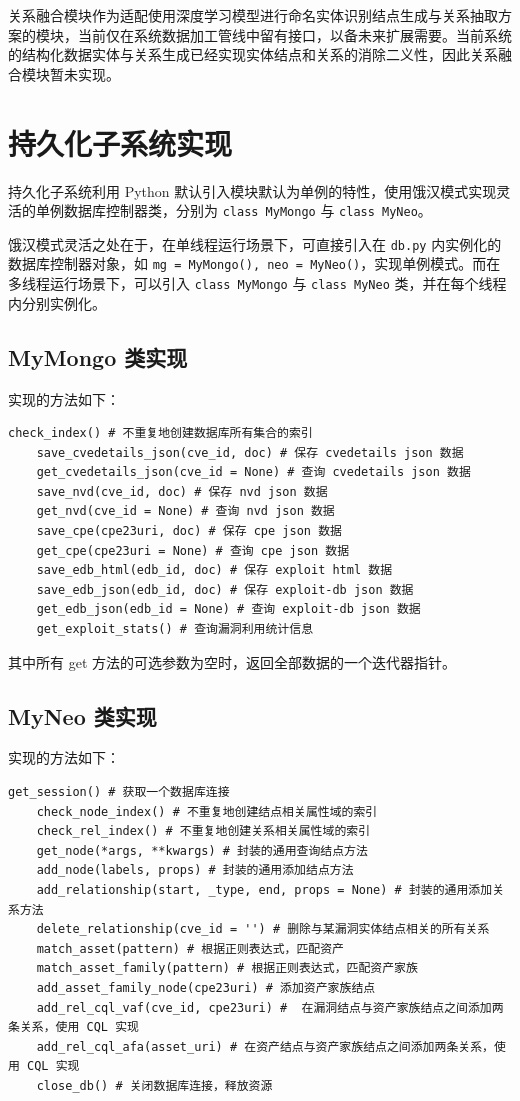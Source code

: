 \documentclass[a4paper,AutoFakeBold,oneside,12pt]{book}
\begin{document}
关系融合模块作为适配使用深度学习模型进行命名实体识别结点生成与关系抽取方案的模块，当前仅在系统数据加工管线中留有接口，以备未来扩展需要。当前系统的结构化数据实体与关系生成已经实现实体结点和关系的消除二义性，因此关系融合模块暂未实现。

\section{持久化子系统实现}

持久化子系统利用 Python 默认引入模块默认为单例的特性，使用饿汉模式\cite{}实现灵活的单例数据库控制器类，分别为 \lstinline|class MyMongo| 与 \lstinline|class MyNeo|。

饿汉模式灵活之处在于，在单线程运行场景下，可直接引入在 \lstinline|db.py| 内实例化的数据库控制器对象，如 \lstinline|mg = MyMongo(), neo = MyNeo()|，实现单例模式。而在多线程运行场景下，可以引入 \lstinline|class MyMongo| 与 \lstinline|class MyNeo| 类，并在每个线程内分别实例化。

\subsection{MyMongo 类实现}

实现的方法如下：
\begin{lstlisting}[style = python]
	check_index() # 不重复地创建数据库所有集合的索引
	save_cvedetails_json(cve_id, doc) # 保存 cvedetails json 数据
	get_cvedetails_json(cve_id = None) # 查询 cvedetails json 数据
	save_nvd(cve_id, doc) # 保存 nvd json 数据
	get_nvd(cve_id = None) # 查询 nvd json 数据
	save_cpe(cpe23uri, doc) # 保存 cpe json 数据
	get_cpe(cpe23uri = None) # 查询 cpe json 数据
	save_edb_html(edb_id, doc) # 保存 exploit html 数据
	save_edb_json(edb_id, doc) # 保存 exploit-db json 数据
	get_edb_json(edb_id = None) # 查询 exploit-db json 数据
	get_exploit_stats() # 查询漏洞利用统计信息
\end{lstlisting}
其中所有 get 方法的可选参数为空时，返回全部数据的一个迭代器指针。

\subsection{MyNeo 类实现}

实现的方法如下：
\begin{lstlisting}[style = python]
	get_session() # 获取一个数据库连接
	check_node_index() # 不重复地创建结点相关属性域的索引
	check_rel_index() # 不重复地创建关系相关属性域的索引
	get_node(*args, **kwargs) # 封装的通用查询结点方法
	add_node(labels, props) # 封装的通用添加结点方法
	add_relationship(start, _type, end, props = None) # 封装的通用添加关系方法
	delete_relationship(cve_id = '') # 删除与某漏洞实体结点相关的所有关系
	match_asset(pattern) # 根据正则表达式，匹配资产
	match_asset_family(pattern) # 根据正则表达式，匹配资产家族
	add_asset_family_node(cpe23uri) # 添加资产家族结点
	add_rel_cql_vaf(cve_id, cpe23uri) #  在漏洞结点与资产家族结点之间添加两条关系，使用 CQL 实现
	add_rel_cql_afa(asset_uri) # 在资产结点与资产家族结点之间添加两条关系，使用 CQL 实现
	close_db() # 关闭数据库连接，释放资源
\end{lstlisting}
\end{document}
